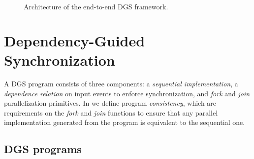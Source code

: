 \begin{figure}
  \centering

  \caption{Architecture of the end-to-end DGS framework.}
\label{dgs:fig:system-architecture-overview}
\end{figure}

\section{Dependency-Guided Synchronization}
\label{dgs:sec:prog-model}

A DGS program consists of three components: a
\emph{sequential implementation}, a \emph{dependence relation} on input
events to enforce synchronization, and \emph{fork} and \emph{join}
parallelization primitives.
In  we define program \emph{consistency}, which are requirements on the \emph{fork} and \emph{join} functions to ensure that any parallel implementation generated from the program is equivalent to the sequential one.

\subsection{DGS programs}
\label{dgs:ssec:prog-model-walkthrough}

